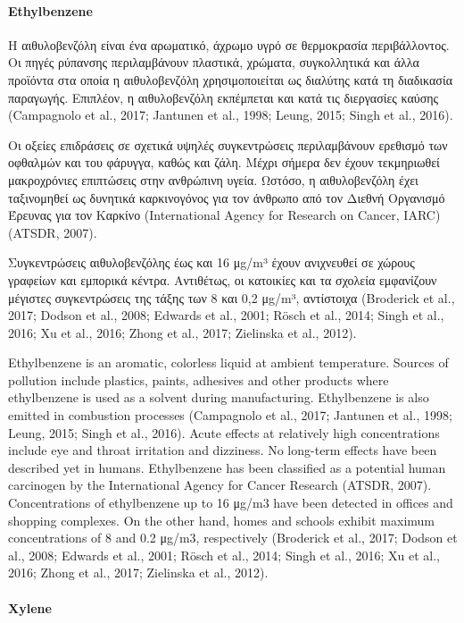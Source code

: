 \paragraph{Ethylbenzene}


Η αιθυλοβενζόλη είναι ένα αρωματικό, άχρωμο υγρό σε θερμοκρασία περιβάλλοντος. Οι πηγές ρύπανσης περιλαμβάνουν πλαστικά, χρώματα, συγκολλητικά και άλλα προϊόντα στα οποία η αιθυλοβενζόλη χρησιμοποιείται ως διαλύτης κατά τη διαδικασία παραγωγής. Επιπλέον, η αιθυλοβενζόλη εκπέμπεται και κατά τις διεργασίες καύσης (Campagnolo et al., 2017; Jantunen et al., 1998; Leung, 2015; Singh et al., 2016).

Οι οξείες επιδράσεις σε σχετικά υψηλές συγκεντρώσεις περιλαμβάνουν ερεθισμό των οφθαλμών και του φάρυγγα, καθώς και ζάλη. Μέχρι σήμερα δεν έχουν τεκμηριωθεί μακροχρόνιες επιπτώσεις στην ανθρώπινη υγεία. Ωστόσο, η αιθυλοβενζόλη έχει ταξινομηθεί ως δυνητικά καρκινογόνος για τον άνθρωπο από τον Διεθνή Οργανισμό Έρευνας για τον Καρκίνο (International Agency for Research on Cancer, IARC) (ATSDR, 2007).

Συγκεντρώσεις αιθυλοβενζόλης έως και 16 μg/m³ έχουν ανιχνευθεί σε χώρους γραφείων και εμπορικά κέντρα. Αντιθέτως, οι κατοικίες και τα σχολεία εμφανίζουν μέγιστες συγκεντρώσεις της τάξης των 8 και 0,2 μg/m³, αντίστοιχα (Broderick et al., 2017; Dodson et al., 2008; Edwards et al., 2001; Rösch et al., 2014; Singh et al., 2016; Xu et al., 2016; Zhong et al., 2017; Zielinska et al., 2012).

Ethylbenzene is an aromatic, colorless liquid at ambient temperature. Sources of pollution include plastics, paints, adhesives and other products where ethylbenzene is used as a solvent during manufacturing. Ethylbenzene is also emitted in combustion processes (Campagnolo et al., 2017; Jantunen et al., 1998; Leung, 2015; Singh et al., 2016). Acute effects at relatively high concentrations include eye and throat irritation and dizziness. No long-term effects have been described yet in humans. Ethylbenzene has been classified as a potential human carcinogen by the International Agency for Cancer Research (ATSDR, 2007). Concentrations of ethylbenzene up to 16 μg/m3 have been detected in offices and shopping complexes. On the other hand, homes and schools exhibit maximum concentrations of 8 and 0.2 μg/m3, respectively (Broderick et al., 2017; Dodson et al., 2008; Edwards et al., 2001; Rösch et al., 2014; Singh et al., 2016; Xu et al., 2016; Zhong et al., 2017; Zielinska et al., 2012).

\paragraph{Xylene}

